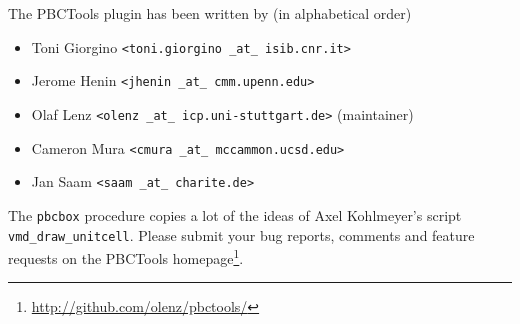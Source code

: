 \documentclass[a4paper, DIV12]{scrartcl}
\newcommand{\pbctools}{PBCTools\xspace}
\begin{document}
The \pbctools plugin has been written by (in alphabetical order)
\begin{itemize}
\item Toni Giorgino \texttt{<toni.giorgino \_at\_ isib.cnr.it>}
\item Jerome Henin \texttt{<jhenin \_at\_ cmm.upenn.edu>}
\item Olaf Lenz \texttt{<olenz \_at\_ icp.uni-stuttgart.de>} (maintainer)
\item Cameron Mura \texttt{<cmura \_at\_ mccammon.ucsd.edu>}
\item Jan Saam \texttt{<saam \_at\_ charite.de>}
\end{itemize}
The \texttt{pbcbox} procedure copies a lot of the ideas of Axel
Kohlmeyer's script \texttt{vmd\_draw\_unitcell}.
Please submit your bug reports, comments and feature requests on the
\pbctools
homepage\footnote{\url{http://github.com/olenz/pbctools/}}.
\end{document}
